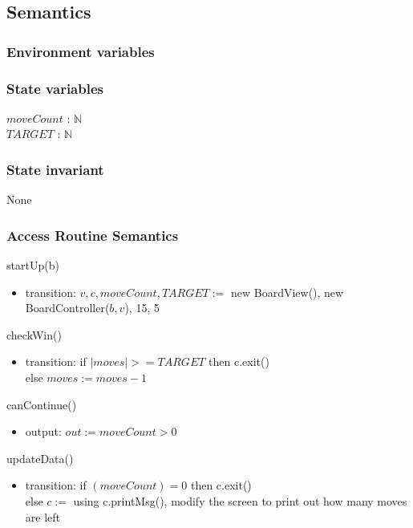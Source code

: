 \documentclass[12pt]{article}
\begin{document}
\subsection* {Semantics}

\subsubsection* {Environment variables}


\subsubsection* {State variables}
\noindent $moveCount$ : $\mathbb{N}$\\
\noindent $TARGET$ : $\mathbb{N}$\\


\subsubsection*{State invariant}
\noindent None

\subsubsection* {Access Routine Semantics}

\noindent startUp(b)
\begin{itemize}
\item transition: $v,c,moveCount,TARGET :=$  new BoardView(), new BoardController($b,v$), 15, 5 
\end{itemize}


\noindent checkWin()
\begin{itemize}
\item transition: if $|moves| >= TARGET$ then c.exit()\\
 else $moves := moves - 1$
\end{itemize}

\noindent canContinue()
\begin{itemize}
\item output: $out := moveCount > 0$
\end{itemize}


\noindent updateData()
\begin{itemize}
\item transition: if $(moveCount) = 0$ then c.exit() \\
else $c := $ using c.printMsg(), modify the screen to print out how many moves are left
\end{itemize}
\end{document}
